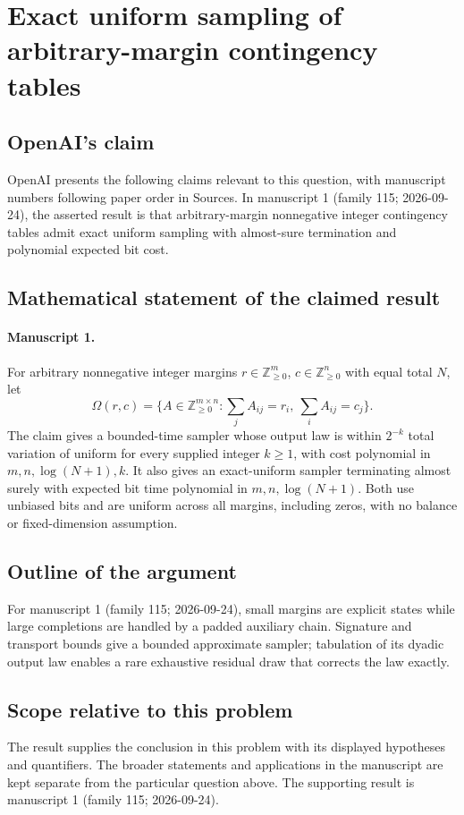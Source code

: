 \documentclass[11pt]{article}
\begin{document}
\section*{Exact uniform sampling of arbitrary-margin contingency tables}

\subsection{OpenAI's claim}
OpenAI presents the following claims relevant to this question, with manuscript numbers following paper order in Sources. In manuscript 1 (family 115; 2026-09-24), the asserted result is that arbitrary-margin nonnegative integer contingency tables admit exact uniform sampling with almost-sure termination and polynomial expected bit cost.

\subsection{Mathematical statement of the claimed result}
\paragraph{Manuscript 1.}
For arbitrary nonnegative integer margins $r\in\mathbb Z_{\ge0}^m$, $c\in\mathbb Z_{\ge0}^n$ with equal total $N$, let
\[
 \Omega(r,c)=\{A\in\mathbb Z_{\ge0}^{m\times n}:\sum_jA_{ij}=r_i,\ \sum_iA_{ij}=c_j\}.
\]
The claim gives a bounded-time sampler whose output law is within $2^{-k}$ total variation of uniform for every supplied integer $k\ge1$, with cost polynomial in $m,n,\log(N+1),k$. It also gives an exact-uniform sampler terminating almost surely with expected bit time polynomial in $m,n,\log(N+1)$. Both use unbiased bits and are uniform across all margins, including zeros, with no balance or fixed-dimension assumption.

\subsection{Outline of the argument}
For manuscript 1 (family 115; 2026-09-24), small margins are explicit states while large completions are handled by a padded auxiliary chain. Signature and transport bounds give a bounded approximate sampler; tabulation of its dyadic output law enables a rare exhaustive residual draw that corrects the law exactly.

\subsection{Scope relative to this problem}
The result supplies the conclusion in this problem with its displayed hypotheses and quantifiers. The broader statements and applications in the manuscript are kept separate from the particular question above. The supporting result is manuscript 1 (family 115; 2026-09-24).
\end{document}
